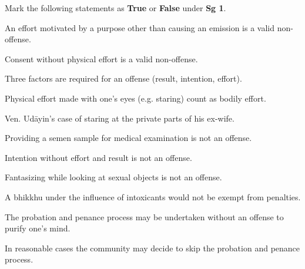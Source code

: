 \begin{exam}{\autoExamName}
\begin{problem*}
\end{problem*}

\clearpage

\begin{problem*}

  Mark the following statements as \textbf{True} or \textbf{False} under \textbf{Sg 1}.

  \bigskip

  \begin{parts}

    \item {} An effort motivated by a purpose other than causing an emission is a valid non-offense.

    \bigskip

    \item {} Consent without physical effort is a valid non-offense.

    \bigskip

    \item {} Three factors are required for an offense (result, intention, effort).

    \bigskip

    \item {} Physical effort made with one's eyes (e.g. staring) count as bodily effort.

    \begin{solution}
      Ven. Udāyin's case of staring at the private parts of his ex-wife.
    \end{solution}

    \bigskip

    \item {} Providing a semen sample for medical examination is not an offense.

    \bigskip

    \item {} Intention without effort and result is not an offense.

    \bigskip

    \item {} Fantasizing while looking at sexual objects is not an offense.

    \bigskip

    \item {} A bhikkhu under the influence of intoxicants would not be exempt from penalties.

    \bigskip

    \item {} The probation and penance process may be undertaken without an offense to purify one's mind.

    \bigskip

    \item {} In reasonable cases the community may decide to skip the probation and penance process.

  \end{parts}

\end{problem*}

\end{exam}
